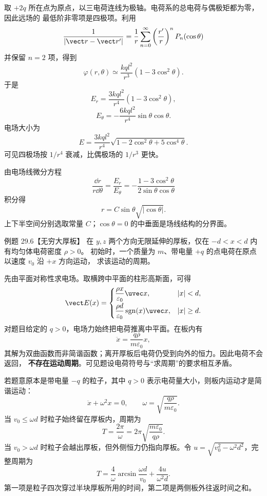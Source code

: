 \begin{xesolution}
取 $+2q$ 所在点为原点，以三电荷连线为极轴。电荷系的总电荷与偶极矩都为零，因此远场的
最低阶非零项是四极项。利用
\[
  \frac{1}{|\vect r-\vect r'|}
  =\frac1r\sum_{n=0}^{\infty}\left(\frac{r'}r\right)^nP_n(\cos\theta)
\]
并保留 $n=2$ 项，得到
\[
  \varphi(r,\theta)\simeq
  \frac{kql^2}{r^3}(1-3\cos^2\theta).
\]
于是
\[
  \boxed{E_r=\frac{3kql^2}{r^4}(1-3\cos^2\theta)},
\]
\[
  \boxed{E_\theta=-\frac{6kql^2}{r^4}\sin\theta\cos\theta}.
\]
电场大小为
\[
  \boxed{E=\frac{3kql^2}{r^4}
  \sqrt{1-2\cos^2\theta+5\cos^4\theta}}.
\]
可见四极场按 $1/r^4$ 衰减，比偶极场的 $1/r^3$ 更快。

由电场线微分方程
\[
  \frac{\dd r}{r\dd\theta}=\frac{E_r}{E_\theta}
  =-\frac{1-3\cos^2\theta}{2\sin\theta\cos\theta}
\]
积分得
\[
  \boxed{r=C\sin\theta\sqrt{|\cos\theta|}}.
\]
上下半空间分别选取常量 $C$；$\cos\theta=0$ 的中垂面是场线结构的分界面。
\end{xesolution}

\Needspace{0.35\textheight}
\begin{origexamplebox}{例题 29.6【无穷大厚板】}
在 $y,z$ 两个方向无限延伸的厚板，仅在 $-d<x<d$ 内有均匀体电荷密度 $\rho>0$。
初始时，一个质量为 $m$、带电量 $+q$ 的点电荷在原点以速度 $v_0$ 沿 $+x$ 方向运动，
求该运动的周期。
\slabDiagram
\end{origexamplebox}

\begin{xesolution}
先由平面对称性求电场。取横跨中平面的柱形高斯面，可得
\[
  \vect E(x)=
  \begin{cases}
    \dfrac{\rho x}{\varepsilon_0}\uvec x, & |x|<d,\\[6pt]
    \dfrac{\rho d}{\varepsilon_0}\operatorname{sgn}(x)\uvec x, & |x|\ge d.
  \end{cases}
\]
对题目给定的 $q>0$，电场力始终把电荷推离中平面。在板内有
\[
  \ddot x=\frac{q\rho}{m\varepsilon_0}x,
\]
其解为双曲函数而非简谐函数；离开厚板后电荷仍受到向外的恒力。因此电荷不会返回，
\textbf{不存在运动周期}。可见题设电荷符号与“求周期”的要求相互矛盾。

若题意原本是带电量 $-q$ 的粒子，其中 $q>0$ 表示电荷量大小，则板内运动才是简谐运动：
\[
  \ddot x+\omega^2x=0,
  \qquad
  \omega=\sqrt{\frac{q\rho}{m\varepsilon_0}}.
\]
当 $v_0\le\omega d$ 时粒子始终留在厚板内，周期为
\[
  \boxed{T=\frac{2\pi}{\omega}
  =2\pi\sqrt{\frac{m\varepsilon_0}{q\rho}}}.
\]
当 $v_0>\omega d$ 时粒子会越出厚板，但外侧恒力仍指向厚板。令
$u=\sqrt{v_0^2-\omega^2d^2}$，完整周期为
\[
  \boxed{T=\frac{4}{\omega}\arcsin\frac{\omega d}{v_0}
  +\frac{4u}{\omega^2d}}.
\]
第一项是粒子四次穿过半块厚板所用的时间，第二项是两侧板外往返时间之和。
\end{xesolution}

